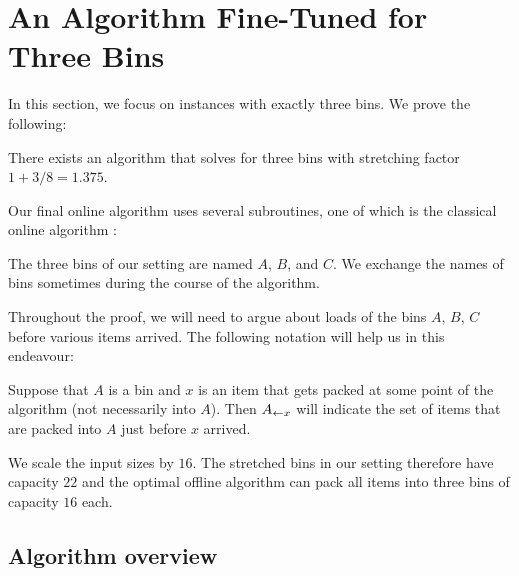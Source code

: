 \chapter{An Algorithm Fine-Tuned for Three Bins}
\label{chap:threebins}

In this section, we focus on instances with exactly three bins. 
We prove the following:

\begin{thm}\label{thm:3binsalgo}
There exists an algorithm that solves
\binstretch for three bins with stretching factor $1+3/8=1.375$.
\end{thm}

Our final online algorithm uses several subroutines, one of which is
the classical online algorithm \FF:

\smallskip
{}
\smallskip

The three bins of our setting are named $A$, $B$, and $C$.  We
exchange the names of bins sometimes during the course of the
algorithm.

Throughout the proof, we will need to argue about loads of the bins
$A$, $B$, $C$ before various items arrived. The following notation
will help us in this endeavour:

Suppose that $A$ is a bin and $x$ is an item that gets packed at some
point of the algorithm (not necessarily into $A$).  Then $A_{\leftarrow
x}$ will indicate the set of items that are packed into $A$ just
before $x$ arrived.

We scale the input sizes by $16$. The stretched bins in our setting
therefore have capacity $22$ and the optimal offline algorithm can
pack all items into three bins of capacity $16$ each.

\section{Algorithm overview}\label{sec:3:algoverview}

